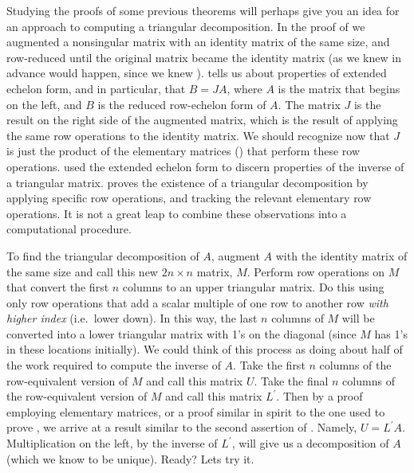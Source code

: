 %
Studying the proofs of some previous theorems will perhaps give you an idea for an approach to computing a triangular decomposition.  In the proof of  we augmented a nonsingular matrix with an identity matrix of the same size, and row-reduced until the original matrix became the identity matrix (as we knew in advance would happen, since we knew ).   tells us about properties of extended echelon form, and in particular, that $B=JA$, where $A$ is the matrix that begins on the left, and $B$ is the reduced row-echelon form of $A$.  The matrix $J$ is the result on the right side of the augmented matrix, which is the result of applying the same row operations to the identity matrix.  We should recognize now that $J$ is just the product of the elementary matrices () that perform these row operations.   used the extended echelon form to discern properties of the inverse of a triangular matrix.   proves the existence of a triangular decomposition by applying specific row operations, and tracking the relevant elementary row operations.  It is not a great leap to combine these observations into a computational procedure.\par
%
To find the triangular decomposition of $A$, augment $A$ with the identity matrix of the same size and call this new $2n\times n$ matrix, $M$.  Perform row operations on $M$ that convert the first $n$ columns to an upper triangular matrix.  Do this using only row operations that add a scalar multiple of one row to another row {\em with higher index} (i.e.\ lower down).  In this way, the last $n$ columns of $M$ will be converted into a lower triangular matrix with 1's on the diagonal (since $M$ has 1's in these locations initially).  We could think of this process as doing about half of the work required to compute the inverse of $A$.  Take the first $n$ columns of the row-equivalent version of $M$ and call this matrix $U$.
Take the final $n$ columns of the row-equivalent version of $M$ and call this matrix $L^\prime$.  Then by a proof employing elementary matrices, or a proof similar in spirit to the one used to prove , we arrive at a result similar to the second assertion of .  Namely, $U=L^\prime A$.  Multiplication on the left, by the inverse of $L^\prime$, will give us a decomposition of $A$ (which we know to be unique).  Ready? Lets try it.
%
%
